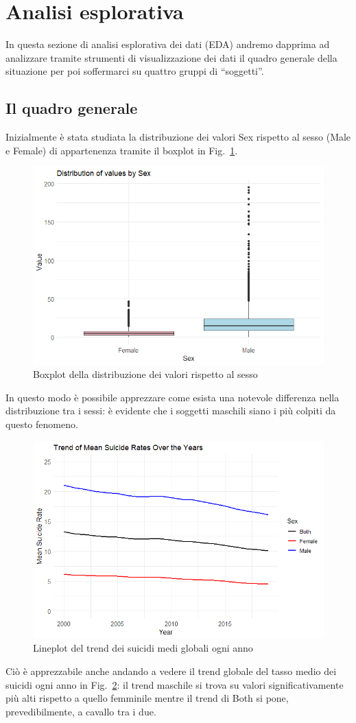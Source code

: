 \documentclass[conference]{IEEEtran}
\begin{document}
\section{Analisi esplorativa}

In questa sezione di analisi esplorativa dei dati (EDA) andremo dapprima
ad analizzare tramite strumenti di visualizzazione dei dati il quadro generale
della situazione per poi soffermarci su quattro gruppi di ``soggetti''.

\subsection{Il quadro generale}

Inizialmente è stata studiata la distribuzione dei valori Sex rispetto
al sesso (Male e Female) di appartenenza tramite il boxplot in Fig.~\ref{1sex}.
\begin{figure}[htbp]
    \centerline{\includegraphics[width=.5\textwidth]{img/1 - Sex2.png}}
    \caption{Boxplot della distribuzione dei valori rispetto al sesso}
    \label{1sex}
\end{figure}
In questo modo è possibile apprezzare come esista una notevole differenza
nella distribuzione tra i sessi: è evidente che i soggetti maschili siano
i più colpiti da questo fenomeno.

\begin{figure}[htbp]
    \centerline{\includegraphics[width=.5\textwidth]{img/2 - Globtrend2.png}}
    \caption{Lineplot del trend dei suicidi medi globali ogni anno}
    \label{2globtrend}
\end{figure}
Ciò è apprezzabile anche andando a vedere il trend globale del
tasso medio dei suicidi ogni anno in Fig.~\ref{2globtrend}: il trend maschile
si trova su valori significativamente più alti rispetto a quello femminile mentre
il trend di Both si pone, prevedibilmente, a cavallo tra i due.
\end{document}

